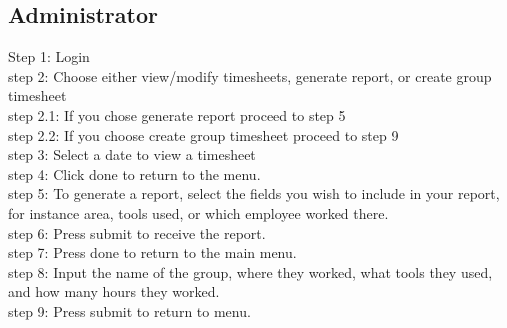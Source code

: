 \documentclass[12pt]{article}
\begin{document}
\subsection{Administrator}
Step 1: Login\\
step 2: Choose either view/modify timesheets, generate report, or create group timesheet\\
step 2.1: If you chose generate report proceed to step 5\\
step 2.2: If you choose create group timesheet proceed to step 9\\
step 3: Select a date to view a timesheet\\
step 4: Click done to return to the menu.\\
step 5: To generate a report, select the fields you wish to include in your report, for instance area, tools used, or which employee worked there.\\
step 6: Press submit to receive the report.\\
step 7: Press done to return to the main menu.\\
step 8: Input the name of the group, where they worked, what tools they used, and how many hours they worked.\\
step 9: Press submit to return to menu.\\
\end{document}
